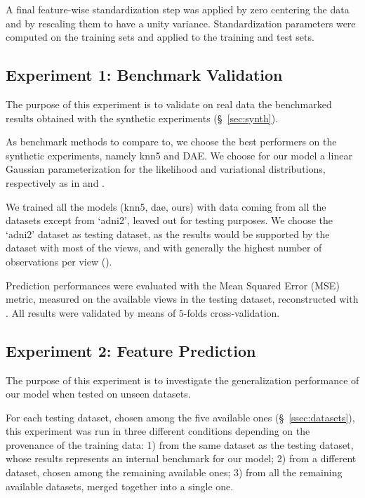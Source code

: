 A final feature-wise standardization step was applied by zero centering the data and by rescaling them to have a unity variance.
Standardization parameters were computed on the training sets and applied to the training and test sets.

\subsection{Experiment 1: Benchmark Validation}


The purpose of this experiment is to validate on real data the benchmarked results obtained with the synthetic experiments (\S~\ref{sec:synth}).

As benchmark methods to compare to, we choose the best performers on the synthetic experiments, namely knn5 and DAE.
We choose for our model a linear Gaussian parameterization for the likelihood and variational distributions, respectively as in  and .

We trained all the models (knn5, dae, ours) with data coming from all the datasets except from `adni2', leaved out for testing purposes.
We choose the `adni2' dataset as testing dataset, as the results would be supported by the dataset with most of the views, and with generally the highest number of observations per view ().

Prediction performances were evaluated with the Mean Squared Error (MSE) metric, measured on the available views in the testing dataset, reconstructed with .
All results were validated by means of $5$-folds cross-validation.

\subsection{Experiment 2: Feature Prediction}
\label{ssec:feats}


The purpose of this experiment is to investigate the generalization performance of our model when tested on unseen datasets.

For each testing dataset, chosen among the five available ones (\S~\ref{ssec:datasets}), this experiment was run in three different conditions depending on the provenance of the training data:
1) from the same dataset as the testing dataset, whose results represents an internal benchmark for our model;
2) from a different dataset, chosen among the remaining available ones;
3) from all the remaining available datasets, merged together into a single one.

